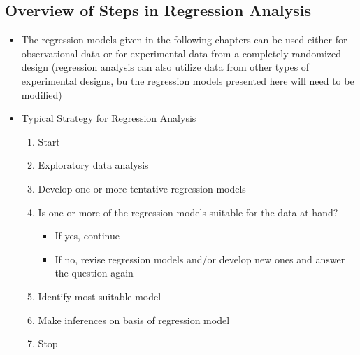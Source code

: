 \subsection{Overview of Steps in Regression Analysis}
\begin{itemize}
\item The regression models given in the following chapters can be used either for observational data or for experimental data from a completely randomized design (regression analysis can also utilize data from other types of experimental designs, bu the regression models presented here will need to be modified) 
\item Typical Strategy for Regression Analysis \begin{enumerate} 
\item Start 
\item Exploratory data analysis
\item Develop one or more tentative regression models 
\item Is one or more of the regression models suitable for the data at hand? \begin{itemize} 
\item If yes, continue
\item If no, revise regression models and/or develop new ones and answer the question again \end{itemize}
\item Identify most suitable model
\item Make inferences on basis of regression model 
\item Stop \end{enumerate} 
\end{itemize}

